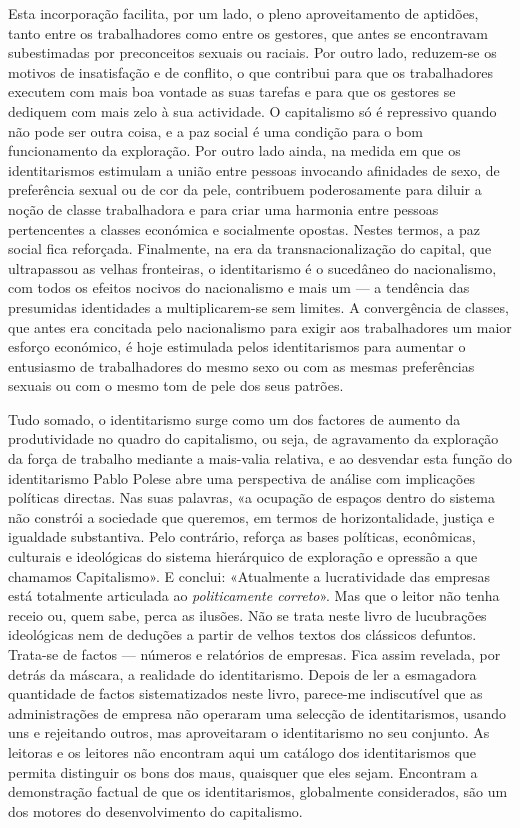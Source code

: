 Esta incorporação facilita, por um lado, o pleno aproveitamento de
aptidões, tanto entre os trabalhadores como entre os gestores, que antes
se encontravam subestimadas por preconceitos sexuais ou raciais. Por
outro lado, reduzem-se os motivos de insatisfação e de conflito, o que
contribui para que os trabalhadores executem com mais boa vontade as
suas tarefas e para que os gestores se dediquem com mais zelo à sua
actividade. O capitalismo só é repressivo quando não pode ser outra
coisa, e a paz social é uma condição para o bom funcionamento da
exploração. Por outro lado ainda, na medida em que os identitarismos
estimulam a união entre pessoas invocando afinidades de sexo, de
preferência sexual ou de cor da pele, contribuem poderosamente para
diluir a noção de classe trabalhadora e para criar uma harmonia entre
pessoas pertencentes a classes económica e socialmente opostas. Nestes
termos, a paz social fica reforçada. Finalmente, na era da
transnacionalização do capital, que ultrapassou as velhas fronteiras, o
identitarismo é o sucedâneo do nacionalismo, com todos os efeitos
nocivos do nacionalismo e mais um --- a tendência das presumidas
identidades a multiplicarem-se sem limites. A convergência de classes,
que antes era concitada pelo nacionalismo para exigir aos trabalhadores
um maior esforço económico, é hoje estimulada pelos identitarismos para
aumentar o entusiasmo de trabalhadores do mesmo sexo ou com as mesmas
preferências sexuais ou com o mesmo tom de pele dos seus patrões.

Tudo somado, o identitarismo surge como um dos factores de aumento da
produtividade no quadro do capitalismo, ou seja, de agravamento da
exploração da força de trabalho mediante a mais-valia relativa, e ao
desvendar esta função do identitarismo Pablo Polese abre uma perspectiva
de análise com implicações políticas directas. Nas suas palavras, «a
ocupação de espaços dentro do sistema não constrói a sociedade que
queremos, em termos de horizontalidade, justiça e igualdade substantiva.
Pelo contrário, reforça as bases políticas, econômicas, culturais e
ideológicas do sistema hierárquico de exploração e opressão a que
chamamos Capitalismo». E conclui: «Atualmente a lucratividade das
empresas está totalmente articulada ao \emph{politicamente correto}».
Mas que o leitor não tenha receio ou, quem sabe, perca as ilusões. Não
se trata neste livro de lucubrações ideológicas nem de deduções a partir
de velhos textos dos clássicos defuntos. Trata-se de factos --- números
e relatórios de empresas. Fica assim revelada, por detrás da máscara, a
realidade do identitarismo. Depois de ler a esmagadora quantidade de
factos sistematizados neste livro, parece-me indiscutível que as
administrações de empresa não operaram uma selecção de identitarismos,
usando uns e rejeitando outros, mas aproveitaram o identitarismo no seu
conjunto. As leitoras e os leitores não encontram aqui um catálogo dos
identitarismos que permita distinguir os bons dos maus, quaisquer que
eles sejam. Encontram a demonstração factual de que os identitarismos,
globalmente considerados, são um dos motores do desenvolvimento do
capitalismo.

